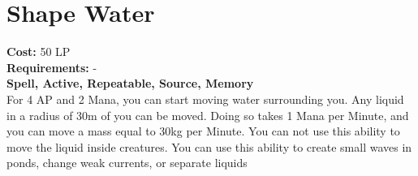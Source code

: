\section{Shape Water}\label{spell:shapeWater}
\textbf{Cost:} 50 LP\\
\textbf{Requirements:} -\\
\textbf{Spell, Active, Repeatable, Source, Memory}\\
For 4 AP and 2 Mana, you can start moving water surrounding you.
Any liquid in a radius of 30m of you can be moved.
Doing so takes 1 Mana per Minute, and you can move a mass equal to 30kg per Minute.
You can not use this ability to move the liquid inside creatures.
You can use this ability to create small waves in ponds, change weak currents, or separate liquids

